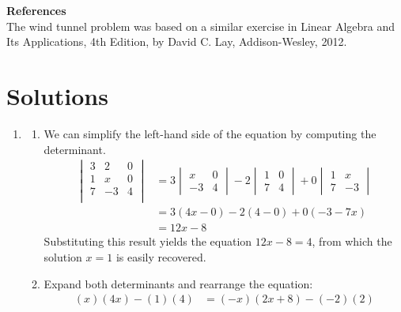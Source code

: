 \documentclass{article}
\begin{document}
\noindent \textbf{References} \\
The wind tunnel problem was based on a similar exercise in Linear Algebra and Its Applications, 4th Edition, by David C. Lay, Addison-Wesley, 2012.

 

\newpage
\section*{Solutions}

\begin{enumerate} 
\item
\begin{enumerate}
\item We can simplify the left-hand side of the equation by computing the determinant.
\begin{align*}
  \begin{vmatrix}
   3 &  2 &  0 \\
   1 &  x &  0 \\
   7 & -3 &  4 \\
  \end{vmatrix}
 &=
  3 \begin{vmatrix} x & 0 \\ -3 & 4 \end{vmatrix} -
  2 \begin{vmatrix} 1 & 0 \\ 7 & 4 \end{vmatrix} +
  0 \begin{vmatrix} 1 & x \\ 7 & -3 \end{vmatrix} \\
 &=
  3(4x - 0) - 2(4 - 0) + 0(-3 -7x) \\
 &=
  12x - 8
\end{align*}
Substituting this result yields the equation $12x - 8 = 4$, from which the 
solution $x = 1$ is easily recovered.
\item
Expand both determinants and rearrange the equation:
\begin{align*}
 (x)(4x) - (1)(4) &= (-x)(2x+8) - (-2)(2) \\

\end{align*}
\end{enumerate}
\end{enumerate}
\end{document}

